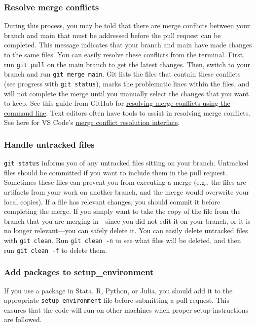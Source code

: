 \subsubsection{Resolve merge conflicts}
During this process, you may be told that there are merge conflicts between
your branch and main that must be addressed before the pull request can be completed.
This message indicates that your branch and main have made changes to the same files.
You can easily resolve these conflicts from the terminal.
First, run \texttt{git pull} on the main branch to get the latest changes.
Then, switch to your branch and run \texttt{git merge main}.
Git lists the files that contain these conflicts
(see progress with \texttt{git status}), marks the problematic lines within the files,
and will not complete the merge until you manually
select the changes that you want to keep.
See this guide from GitHub for
\href{https://help.github.com/articles/resolving-a-merge-conflict-using-the-command-line/}{resolving merge conflicts using the command line}.
Text editors often have tools to assist in resolving merge conflicts.
See here for VS Code's \href{https://code.visualstudio.com/docs/editor/versioncontrol#_merge-conflicts}{merge conflict resolution interface}.

\subsubsection{Handle untracked files}
\texttt{git status} informs you of any untracked files sitting on your branch.
Untracked files should be committed if you want to include them in the pull request.
Sometimes these files can prevent you from executing a merge
(e.g., the files are artifacts from your work on another branch, and
the merge would overwrite your local copies).
If a file has relevant changes, you should commit it before completing the merge.
If you simply want to take the copy of the file from the branch that you are merging
in---since you did not edit it on your branch, or it is no longer relevant---you
can safely delete it.
You can easily delete untracked files with \texttt{git clean}.
Run \texttt{git clean -n} to see what files will be deleted,
and then run \texttt{git clean -f} to delete them.

\subsubsection{Add packages to setup\_environment}
If you use a package in Stata, R, Python, or Julia,
you should add it to the appropriate \texttt{setup\_environment} file before
submitting a pull request.
This ensures that the code will run on other machines when proper setup
instructions are followed.

